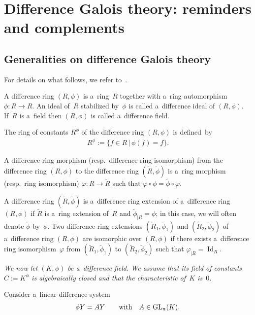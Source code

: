 \section{Dif\/ference Galois theory: reminders and complements}
\label{sec2}

\subsection{Generalities on dif\/ference Galois theory}

For details on what follows, we refer to~\cite[Chapter~1]{VdPS97}.

A dif\/ference ring $(R,\phi)$ is a~ring~$R$ together with a~ring automorphism $\phi: R \rightarrow R$.
An ideal of~$R$ stabilized by~$\phi$ is called a~dif\/ference ideal of $(R,\phi)$.
If~$R$ is a~f\/ield then $(R,\phi)$ is called a~dif\/ference f\/ield.

The ring of constants $R^{\phi}$ of the dif\/ference ring $(R,\phi)$ is def\/ined~by
\begin{gather*}
R^{\phi}:=\{f \in R \, | \, \phi(f)=f\}.
\end{gather*}

A dif\/ference ring morphism (resp.\
dif\/ference ring isomorphism) from the dif\/ference ring $(R,\phi)$ to the dif\/ference ring
$(\widetilde{R},\widetilde{\phi})$ is a~ring morphism (resp.\
ring isomorphism) $\varphi: R \rightarrow \widetilde{R}$ such that $\varphi \circ \phi = \widetilde{\phi} \circ
\varphi$.

A dif\/ference ring $(\widetilde{R},\widetilde{\phi})$ is a~dif\/ference ring extension of a~dif\/ference ring $(R,\phi)$ if
$\widetilde{R}$ is a~ring extension of~$R$ and $\widetilde{\phi}_{\vert R}=\phi$; in this case, we will often denote
$\widetilde{\phi}$ by~$\phi$.
Two dif\/ference ring extensions $(\widetilde{R}_{1},\widetilde{\phi}_{1})$ and $(\widetilde{R}_{2},\widetilde{\phi}_{2})$
of a~dif\/ference ring $(R,\phi)$ are isomorphic over $(R,\phi)$ if there exists a~dif\/ference ring isomorphism~$\varphi$
from $(\widetilde{R}_{1},\widetilde{\phi}_{1})$ to $(\widetilde{R}_{2},\widetilde{\phi}_{2})$ such that $\varphi_{\vert
R}=\operatorname{Id}_{R}$.

{\it We now let $(K,\phi)$ be a~difference field.
We assume that its field of constants $C:=K^{\phi}$ is algebraically closed and that the characteristic of~$K$ is~$0$.}

Consider a~linear dif\/ference system
\begin{gather}
\label{the generic system}
\phi Y=AY \qquad \hbox{with} \quad A \in \operatorname{GL}_{n}(K).
\end{gather}

